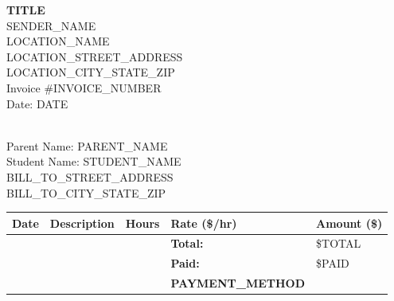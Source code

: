 \documentclass[11pt]{article}
\begin{document}
\pagestyle{empty}

\begin{center}
  {\LARGE\bf {TITLE}} \\
  {\large {SENDER_NAME}} \\
  \vspace{0.5em}
  {\large {LOCATION_NAME}} \\
  {\large {LOCATION_STREET_ADDRESS}} \\
  {\large {LOCATION_CITY_STATE_ZIP}} \\
  \vspace{2em}
  {\large Invoice \#{INVOICE_NUMBER}} \\
  {Date: {DATE}}
\end{center}

\vspace{1em}

 \\
Parent Name: {PARENT_NAME} \\
Student Name: {STUDENT_NAME} \\
{BILL_TO_STREET_ADDRESS} \\
{BILL_TO_CITY_STATE_ZIP} \\

\vspace{1em}

\vspace{1em}

\renewcommand{\arraystretch}{1.2}
\begin{longtable}{@{} p{3cm} p{6cm} p{2cm} p{2cm} p{2cm} @{} }
  \toprule
  \textbf{Date} & \textbf{Description} & \textbf{Hours} & \textbf{Rate (\$/hr)} & \textbf{Amount (\$)} \\
  \midrule
  \midrule
  & & & \textbf{Total:} & \${TOTAL} \\
  & & & \textbf{Paid:} & \${PAID} \\
  & & & \textbf{{PAYMENT_METHOD}} & \\
  \bottomrule
\end{longtable}

\vfill
\end{document}
